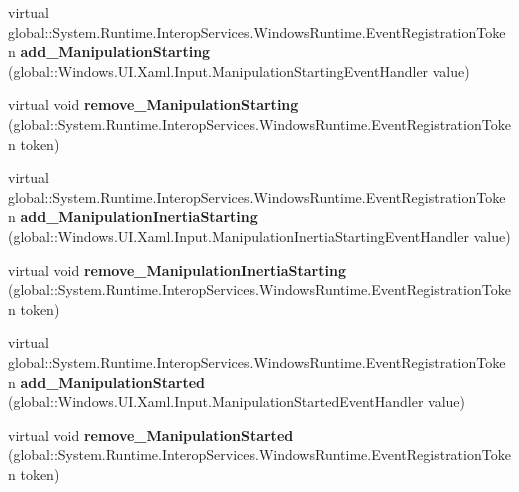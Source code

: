 \begin{DoxyCompactItemize}
\item 
\mbox{\label{class_windows_1_1_u_i_1_1_xaml_1_1_u_i_element_ab2370986b3c9a39fbf279765c5314e6a}} 
virtual global\+::\+System.\+Runtime.\+Interop\+Services.\+Windows\+Runtime.\+Event\+Registration\+Token {\bfseries add\+\_\+\+Manipulation\+Starting} (global\+::\+Windows.\+U\+I.\+Xaml.\+Input.\+Manipulation\+Starting\+Event\+Handler value)
\item 
\mbox{\label{class_windows_1_1_u_i_1_1_xaml_1_1_u_i_element_a6b3fdc2deaa4b4844b6f70ba634a074e}} 
virtual void {\bfseries remove\+\_\+\+Manipulation\+Starting} (global\+::\+System.\+Runtime.\+Interop\+Services.\+Windows\+Runtime.\+Event\+Registration\+Token token)
\item 
\mbox{\label{class_windows_1_1_u_i_1_1_xaml_1_1_u_i_element_a720897f9e46f85c8b896d40d415419c3}} 
virtual global\+::\+System.\+Runtime.\+Interop\+Services.\+Windows\+Runtime.\+Event\+Registration\+Token {\bfseries add\+\_\+\+Manipulation\+Inertia\+Starting} (global\+::\+Windows.\+U\+I.\+Xaml.\+Input.\+Manipulation\+Inertia\+Starting\+Event\+Handler value)
\item 
\mbox{\label{class_windows_1_1_u_i_1_1_xaml_1_1_u_i_element_a70d5f221b113c0f94830ff04ba95e077}} 
virtual void {\bfseries remove\+\_\+\+Manipulation\+Inertia\+Starting} (global\+::\+System.\+Runtime.\+Interop\+Services.\+Windows\+Runtime.\+Event\+Registration\+Token token)
\item 
\mbox{\label{class_windows_1_1_u_i_1_1_xaml_1_1_u_i_element_a267e7d9d4c83d6c6a025e11165660ad9}} 
virtual global\+::\+System.\+Runtime.\+Interop\+Services.\+Windows\+Runtime.\+Event\+Registration\+Token {\bfseries add\+\_\+\+Manipulation\+Started} (global\+::\+Windows.\+U\+I.\+Xaml.\+Input.\+Manipulation\+Started\+Event\+Handler value)
\item 
\mbox{\label{class_windows_1_1_u_i_1_1_xaml_1_1_u_i_element_af6ad67fc431c2034b4431d6cf4776b22}} 
virtual void {\bfseries remove\+\_\+\+Manipulation\+Started} (global\+::\+System.\+Runtime.\+Interop\+Services.\+Windows\+Runtime.\+Event\+Registration\+Token token)

\end{DoxyCompactItemize}
